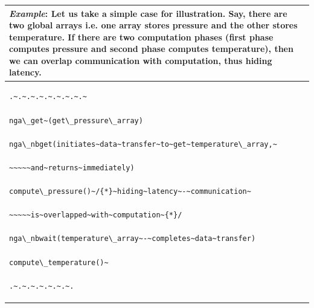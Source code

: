 \begin{tabular}{|>{\raggedright}p{13cm}|}
\hline 
\emph{Example}: Let us take a simple case for illustration. Say, there
are two global arrays i.e. one array stores pressure and the other
stores temperature. If there are two computation phases (first phase
computes pressure and second phase computes temperature), then we
can overlap communication with computation, thus hiding latency.\tabularnewline
\hline 
\begin{verbatim}
.~.~.~.~.~.~.~.~.~

nga\_get~(get\_pressure\_array)

nga\_nbget(initiates~data~transfer~to~get~temperature\_array,~

~~~~~and~returns~immediately)

compute\_pressure()~/{*}~hiding~latency~-~communication~

~~~~~is~overlapped~with~computation~{*}/

nga\_nbwait(temperature\_array~-~completes~data~transfer)

compute\_temperature()~

.~.~.~.~.~.~.~.
\end{verbatim}
\tabularnewline
\hline
\end{tabular}


